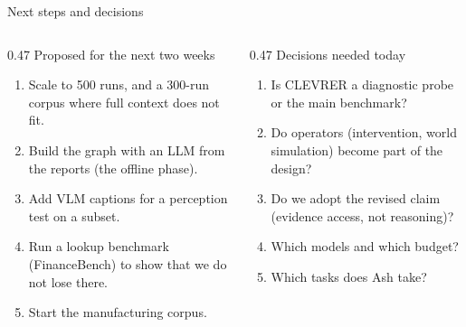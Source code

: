 \documentclass[aspectratio=169,11pt]{beamer}
\newcommand{\lbl}[1]{{\color{Mute}\fontsize{9.5}{12}\selectfont #1}\par}
\begin{document}
\begin{frame}{Next steps and decisions}
  \vspace{0.25cm}
  \begin{columns}[T,onlytextwidth]
    \begin{column}{0.47\textwidth}
      \lbl{Proposed for the next two weeks}
      {\fontsize{10.5}{14}\selectfont
      \begin{enumerate}\setlength{\itemsep}{3pt}
        \item Scale to 500 runs, and a 300-run corpus where full context does not fit.
        \item Build the graph with an LLM from the reports (the offline phase).
        \item Add VLM captions for a perception test on a subset.
        \item Run a lookup benchmark (FinanceBench) to show that we do not lose there.
        \item Start the manufacturing corpus.
      \end{enumerate}}
    \end{column}
    \begin{column}{0.47\textwidth}
      \lbl{Decisions needed today}
      {\fontsize{10.5}{14}\selectfont
      \begin{enumerate}\setlength{\itemsep}{3pt}
        \item Is CLEVRER a diagnostic probe or the main benchmark?
        \item Do operators (intervention, world simulation) become part of the design?
        \item Do we adopt the revised claim (evidence access, not reasoning)?
        \item Which models and which budget?
        \item Which tasks does Ash take?
      \end{enumerate}}
    \end{column}
  \end{columns}
\end{frame}
\end{document}
